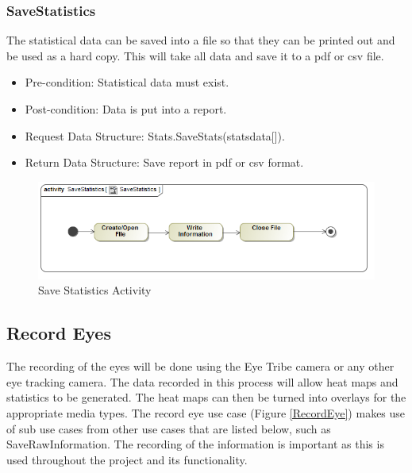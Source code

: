 		\subsubsection{SaveStatistics}
The statistical data can be saved into a file so that they can be printed out and be used as a hard copy. This will take all data and save it to a pdf or csv file.
\begin{itemize}
\item Pre-condition: Statistical data must exist.
\item Post-condition: Data is put into a report.
\item Request Data Structure: Stats.SaveStats(statsdata[]).
\item Return Data Structure: Save report in pdf or csv format.
\end{itemize}

\begin{figure}[!ht]
	\centering
	\includegraphics[scale=0.5]{Diagrams/Activity_Diagram__SaveStatistics__SaveStatistics.png}
	\caption{Save Statistics Activity}
	\end{figure}
	
\subsection{Record Eyes}
The recording of the eyes will be done using the Eye Tribe camera or any other eye tracking camera. The data recorded in this process will allow heat maps and statistics to be generated. The heat maps can then be turned into overlays for the appropriate media types. The record eye use case (Figure \ref{RecordEye}) makes use of sub use cases from other use cases that are listed below, such as SaveRawInformation. The recording of the information is important as this is used throughout the project and its functionality.
\newline

